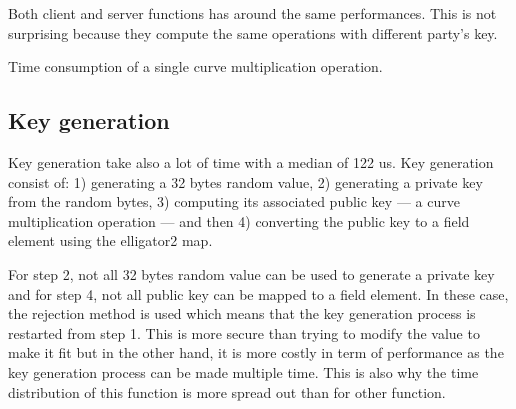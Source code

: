\documentclass[../report.tex]{subfiles}
\begin{document}

Both client and server functions has around the same performances. This is not surprising because they compute the same operations with different party's key.

\pgfplotsset{width=\textwidth +0.2cm}
\pgfplotsset{height=6cm}


Time consumption of a single curve multiplication operation.

\pgfplotsset{width=\textwidth-2.4cm}
\pgfplotsset{height=4cm}


\subsection{Key generation}

Key generation take also a lot of time with a median of 122 us. Key generation consist of: 1) generating a 32 bytes random value, 2) generating a private key from the random bytes, 3) computing its associated public key --- a curve multiplication operation --- and then 4) converting the public key to a field element using the elligator2 map.

For step 2, not all 32 bytes random value can be used to generate a private key and for step 4, not all public key can be mapped to a field element.
In these case, the rejection method is used which means that the key generation process is restarted from step 1. This is more secure than trying to modify the value to make it fit but in the other hand, it is more costly in term of performance as the key generation process can be made multiple time.
This is also why the time distribution of this function is more spread out than for other function.
\end{document}
